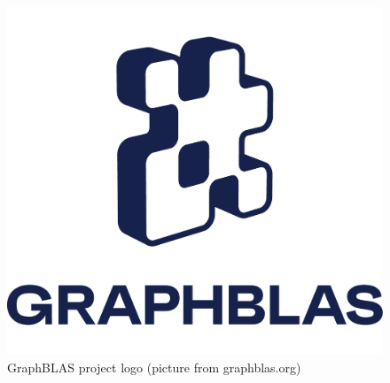 \documentclass[aspectratio=169,xcolor=table,english]{beamer}
\begin{document}
\begin{frame}[fragile]
\begin{minipage}[m]{0.3\linewidth}
\begin{figure}
            \includegraphics[width=\textwidth]{figures/graphblas-logo.png}
            \caption{GraphBLAS project logo (picture from graphblas.org)}
            \label{fig:graphmlas}
        \end{figure}
    \end{minipage}
\end{frame}
\end{document}
